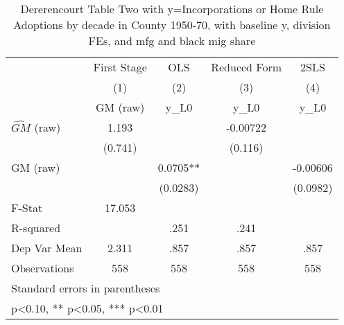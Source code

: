 \begin{table}[htbp]\centering
\def\sym#1{\ifmmode^{#1}\else\(^{#1}\)\fi}
\caption{Dererencourt Table Two with y=Incorporations or Home Rule Adoptions by decade in County 1950-70, with baseline y, division FEs, and mfg and black mig share}
\begin{tabular}{l*{4}{c}}
\toprule
                    & First Stage   &         OLS   &Reduced Form   &        2SLS   \\
                    &\multicolumn{1}{c}{(1)}&\multicolumn{1}{c}{(2)}&\multicolumn{1}{c}{(3)}&\multicolumn{1}{c}{(4)}\\
                    &\multicolumn{1}{c}{GM  (raw)}&\multicolumn{1}{c}{y\_L0}&\multicolumn{1}{c}{y\_L0}&\multicolumn{1}{c}{y\_L0}\\
\midrule
$\hat{GM}$ (raw)    &       1.193   &               &    -0.00722   &               \\
                    &     (0.741)   &               &     (0.116)   &               \\
\addlinespace
GM  (raw)           &               &      0.0705** &               &    -0.00606   \\
                    &               &    (0.0283)   &               &    (0.0982)   \\
\midrule
F-Stat              &      17.053   &               &               &               \\
R-squared           &               &        .251   &        .241   &               \\
Dep Var Mean        &       2.311   &        .857   &        .857   &        .857   \\
Observations        &         558   &         558   &         558   &         558   \\
\bottomrule
\multicolumn{5}{l}{\footnotesize Standard errors in parentheses}\\
\multicolumn{5}{l}{\footnotesize * p<0.10, ** p<0.05, *** p<0.01}\\
\end{tabular}
\end{table}
